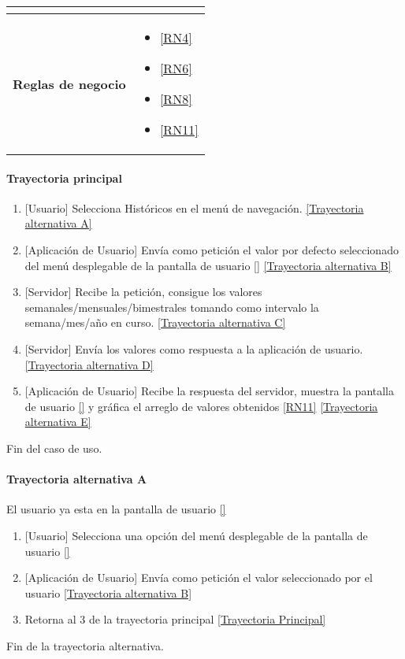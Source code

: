 \begin{longtable}{|J{5cm}|J{10.3cm}|}
\begin{itemize}
		\end{itemize} \\ \hline
	\textbf{Reglas de negocio} & 
		\begin{itemize}
		    \item \ref{RN4}
		    \item \ref{RN6}
			\item \ref{RN8}
			\item \ref{RN11}
		\end{itemize} \\ \hline

\end{longtable}

\paragraph{Trayectoria principal}
    \label{SUB-M-CU1.5:TP}
	\begin{enumerate}
	    \item {[Usuario]} Selecciona Históricos en el menú de navegación. \hyperref[SUB-M-CU6:TA]{[Trayectoria alternativa A]} 
		\item {[Aplicación de Usuario]} Envía como petición el valor por defecto seleccionado del menú desplegable de la pantalla de usuario \ref{} \hyperref[SUB-M-CU6:TB]{[Trayectoria alternativa B]} 
		\item {[Servidor]} Recibe la petición, consigue los valores semanales/mensuales/bimestrales tomando como intervalo la semana/mes/año en curso. \hyperref[SUB-M-CU6:TC]{[Trayectoria alternativa C]} 
		\item {[Servidor]} Envía los valores como respuesta a la aplicación de usuario. \hyperref[SUB-M-CU6:TD]{[Trayectoria alternativa D]}
        \item {[Aplicación de Usuario]} Recibe la respuesta del servidor, muestra la pantalla de usuario \ref{} y gráfica el arreglo de valores obtenidos \ref{RN11} \hyperref[SUB-M-CU6:TE]{[Trayectoria alternativa E]}
	\end{enumerate}
	Fin del caso de uso.

\paragraph{Trayectoria alternativa A} \label{SUB-M-CU6:TA}
    El usuario ya esta en la pantalla de usuario \ref{}
	\begin{enumerate}[label=A\arabic*.]
	    \item {[Usuario]} Selecciona una opción del menú desplegable de la pantalla de usuario \ref{}
	    \item {[Aplicación de Usuario]} Envía como petición el valor seleccionado por el usuario \hyperref[SUB-M-CU6:TB]{[Trayectoria alternativa B]} 
	    \item Retorna al 3 de la trayectoria principal \hyperref[SUB-M-CU6:TP]{[Trayectoria Principal]}
	\end{enumerate}
	Fin de la trayectoria alternativa.
	
